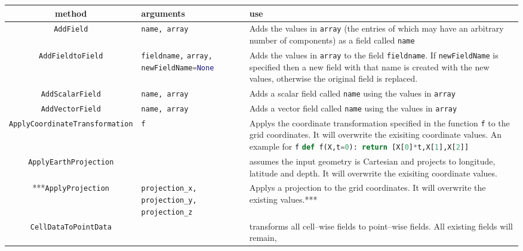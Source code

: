 \begin{landscape}
\begin{longtable}{|c | p{}| |p{}|} \hline
\centering
  method & arguments & use \\ \hline
\lstinline[language=Python]+AddField+ & \lstinline[language=Python]+name, array+ & Adds the values in \lstinline[language=Python]+array+ (the entries of which may have an arbitrary number of components) as a field called \lstinline[language=Python]+name+ \\ \hline
%
\lstinline[language=Python]+AddFieldtoField+ & \lstinline[language=Python]+fieldname,+ \lstinline[language=Python]+array,+ \lstinline[language=Python]+newFieldName=None+ & Adds the values in \lstinline[language=Python]+array+ to the field \lstinline[language=Python]+fieldname+. If \lstinline[language=Python]+newFieldName+ is specified then a new field with that name is created with the new values, otherwise the original field is replaced. \\ \hline
%
\lstinline[language=Python]+AddScalarField+ & \lstinline[language=Python]+name, array+ & Adds a scalar field called \lstinline[language=Python]+name+ using the values in \lstinline[language=Python]+array+ \\ \hline
%
\lstinline[language=Python]+AddVectorField+ & \lstinline[language=Python]+name, array+ & Adds a vector field called \lstinline[language=Python]+name+ using the values in \lstinline[language=Python]+array+ \\ \hline
%
\lstinline[language=Python]+ApplyCoordinateTransformation+ & \lstinline[language=Python]+f+ & Applys the coordinate transformation specified in the function \lstinline[language=Python]+f+ to the grid coordinates. It will overwrite the exisiting coordinate values. An example for \lstinline[language=Python]+f+  \lstinline[language=Python]+def f(X,t=0): return [X[0]*t,X[1],X[2]]+ \\ \hline
%
\lstinline[language=Python]+ApplyEarthProjection+ & & assumes the input geometry is Cartesian and projects to longitude, latitude and depth. It will overwrite the exisiting coordinate values. \\ \hline
%
***\lstinline[language=Python]+ApplyProjection+ & \lstinline[language=Python]+projection_x,+ \lstinline[language=Python]+projection_y,+ \lstinline[language=Python]+projection_z+ & Applys a projection to the grid coordinates. It will overwrite the existing values.*** \\ \hline
%
\lstinline[language=Python]+CellDataToPointData+ & & transforms all cell--wise fields to point--wise fields. All existing fields will remain, \\ \hline

\end{longtable}
\end{landscape}
